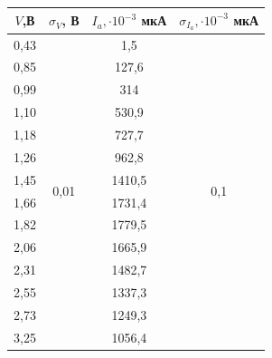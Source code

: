 \documentclass[a4paper,12pt]{report}
\begin{document}
\begin{table}[H]
\begin{tabular}{|c|c|c|c|}
\hline
$V$,В  & $\sigma_V$, В              & $I_a, \cdot 10^{-3}$ мкА  & $\sigma_{I_{a}},\cdot10^{-3}$ мкА    \\ \hline
0,43 & \multirow{14}{*}{0,01} & 1,5             & \multirow{14}{*}{0,1}  \\ \cline{1-1} \cline{3-3}
0,85 &                        & 127,6           &                        \\ \cline{1-1} \cline{3-3}
0,99 &                        & 314             &                        \\ \cline{1-1} \cline{3-3}
1,10 &                        & 530,9           &                        \\ \cline{1-1} \cline{3-3}
1,18 &                        & 727,7           &                        \\ \cline{1-1} \cline{3-3}
1,26 &                        & 962,8           &                        \\ \cline{1-1} \cline{3-3}
1,45 &                        & 1410,5          &                        \\ \cline{1-1} \cline{3-3}
1,66 &                        & 1731,4          &                        \\ \cline{1-1} \cline{3-3}
1,82 &                        & 1779,5          &                        \\ \cline{1-1} \cline{3-3}
2,06 &                        & 1665,9          &                        \\ \cline{1-1} \cline{3-3}
2,31 &                        & 1482,7          &                        \\ \cline{1-1} \cline{3-3}
2,55 &                        & 1337,3          &                        \\ \cline{1-1} \cline{3-3}
2,73 &                        & 1249,3          &                        \\ \cline{1-1} \cline{3-3}
3,25 &                        & 1056,4          &                        \\ \hline


\end{tabular}
\end{table}
\end{document}

